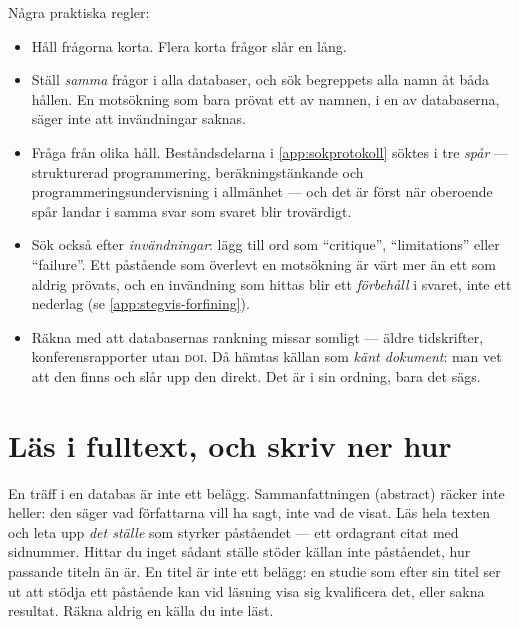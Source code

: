 Några praktiska regler:
\begin{itemize}
  \item Håll frågorna korta.  Flera korta frågor slår en lång.
  \item Ställ \emph{samma} frågor i alla databaser, och sök begreppets
    alla namn åt båda hållen.  En motsökning som bara prövat ett av
    namnen, i en av databaserna, säger inte att invändningar saknas.
  \item Fråga från olika håll.  Beståndsdelarna i \cref{app:sokprotokoll}
    söktes i tre \emph{spår} --- strukturerad programmering,
    beräkningstänkande och programmeringsundervisning i allmänhet --- och
    det är först när oberoende spår landar i samma svar som svaret blir
    trovärdigt.
  \item Sök också efter \emph{invändningar}: lägg till ord som
    \enquote{critique}, \enquote{limitations} eller \enquote{failure}.  Ett
    påstående som överlevt en motsökning är värt mer än ett som aldrig
    prövats, och en invändning som hittas blir ett \emph{förbehåll} i
    svaret, inte ett nederlag (se \cref{app:stegvis-forfining}).
  \item Räkna med att databasernas rankning missar somligt --- äldre
    tidskrifter, konferensrapporter utan \textsc{doi}.  Då hämtas källan
    som \emph{känt dokument}: man vet att den finns och slår upp den
    direkt.  Det är i sin ordning, bara det sägs.
\end{itemize}

\section{Läs i fulltext, och skriv ner hur}

En träff i en databas är inte ett belägg.  Sammanfattningen
(\foreignlanguage{english}{abstract}) räcker inte heller: den säger vad
författarna vill ha sagt, inte vad de visat.  Läs hela texten och leta
upp \emph{det ställe} som styrker påståendet --- ett ordagrant citat med
sidnummer.  Hittar du inget sådant ställe stöder källan inte påståendet,
hur passande titeln än är.  En titel är inte ett belägg: en studie som
efter sin titel ser ut att stödja ett påstående kan vid läsning visa sig
kvalificera det, eller sakna resultat.  Räkna aldrig en källa du inte
läst.

